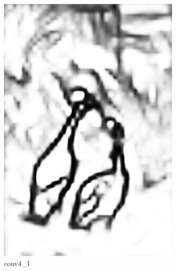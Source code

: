 \documentclass[a4paper]{ctexart}
\begin{document}
\begin{figure}[htb]
\begin{subfigure}{0.2\textwidth}
			\includegraphics[width=\linewidth]{picture/LLIE/RCF/conv4_1}
			\captionsetup{font=scriptsize}
			\caption{conv4\_1}
			\label{fig: conv4_1}
		\end{subfigure}
		\begin{subfigure}{0.2\textwidth}

\end{subfigure}
\end{figure}
\end{document}
